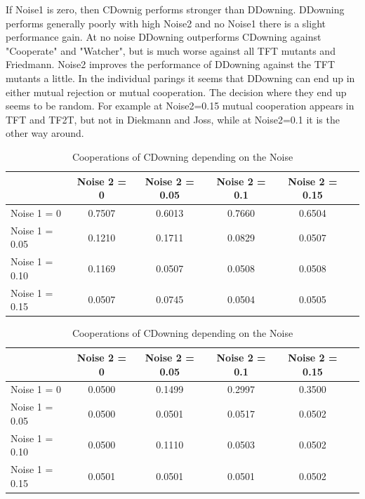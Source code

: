 \documentclass[11pt,twoside]{article}
\begin{document}
If Noise1 is zero, then CDownig performs stronger than DDowning. DDowning performs generally poorly with high Noise2 and no Noise1 there is a slight performance gain. At no noise DDowning outperforms CDowning against "Cooperate" and "Watcher", but is much worse against all TFT mutants and Friedmann. Noise2 improves the performance of DDowning against the TFT mutants a little. In the individual parings it seems that DDowning can end up in either mutual rejection or mutual cooperation. The decision where they end up seems to be random. For example at Noise2=0.15 mutual cooperation appears in TFT and TF2T, but not in Diekmann and Joss, while at Noise2=0.1 it is the other way around.

\begin{table}[h]
 \begin{center}
\caption{Cooperations of CDowning depending on the Noise} \vspace{3mm}
\begin{tabular}{|l|c|c|c|c|c|}
\hline
   	& Noise 2 = 0 & Noise 2 = 0.05& Noise 2 = 0.1& Noise 2 = 0.15 \\
  \hline
  Noise 1 = 0 	&      0.7507  &  0.6013 &   0.7660 &  0.6504 \\
 \hline
  Noise 1 = 0.05	 &           0.1210  &  0.1711  &  0.0829 &  0.0507 \\
 \hline
  Noise 1 = 0.10 	&          0.1169   & 0.0507 &   0.0508  &  0.0508 \\
 \hline
  Noise 1 = 0.15 	&        0.0507  &  0.0745 &   0.0504 &  0.0505 \\
 \hline
\end{tabular}
 \end{center}
\end{table}

\begin{table}[h]
 \begin{center}
\caption{Cooperations of CDowning depending on the Noise} \vspace{3mm}
\begin{tabular}{|l|c|c|c|c|c|}
\hline
   	& Noise 2 = 0 & Noise 2 = 0.05& Noise 2 = 0.1& Noise 2 = 0.15 \\
  \hline
  Noise 1 = 0 	&        0.0500  &  0.1499&   0.2997  &  0.3500 \\
 \hline
  Noise 1 = 0.05	 &              0.0500   & 0.0501  &  0.0517  & 0.0502 \\
 \hline
  Noise 1 = 0.10 	&             0.0500 &   0.1110  &  0.0503  &  0.0502 \\
 \hline
  Noise 1 = 0.15 	&          0.0501  &  0.0501 &   0.0501  &  0.0502 \\
 \hline
\end{tabular}
 \end{center}
\end{table}
\end{document}

